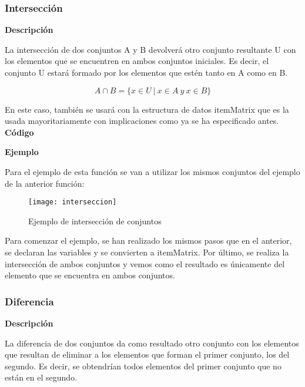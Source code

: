 \subsubsection{Intersecci\'on}

    \textbf{Descripci\'on}
    
    La intersecci\'on de dos conjuntos A y B devolver\'a otro conjunto resultante U con los elementos 
    que se encuentren en ambos conjuntos iniciales. Es decir, el conjunto U estar\'a formado por los elementos 
    que est\'en tanto en A como en B.

    \[
    A \cap B = \{x\in U ~ | ~ x\in A ~ y ~ x\in B \}
    \]

    En este caso, tambi\'en se usar\'a con la estructura de datos itemMatrix que es la usada mayoritariamente con implicaciones 
    como ya se ha especificado antes.
    \\


    \textbf{C\'odigo}

    
    
    \textbf{Ejemplo}

    Para el ejemplo de esta funci\'on se van a utilizar los mismos conjuntos del ejemplo de la anterior funci\'on:

    \begin{figure}[H]
        \centering
        \texttt{[image: interseccion]}
        \caption{Ejemplo de intersecci\'on de conjuntos}
        \label{fig:interseccion}
    \end{figure}

    Para comenzar el ejemplo, se han realizado los mismos pasos que en el anterior, se declaran las variables y se convierten a 
    itemMatrix. 
    Por \'ultimo, se realiza la intersecci\'on de ambos conjuntos y vemos como el resultado es \'unicamente del elemento que se encuentra 
    en ambos conjuntos.




\subsubsection{Diferencia}

    \textbf{Descripci\'on}

    La diferencia de dos conjuntos da como resultado otro conjunto con los elementos que resultan de 
    eliminar a los elementos que forman el primer conjunto, los del segundo. Es decir, se obtendr\'ian 
    todos elementos del primer conjunto que no est\'an en el segundo.

